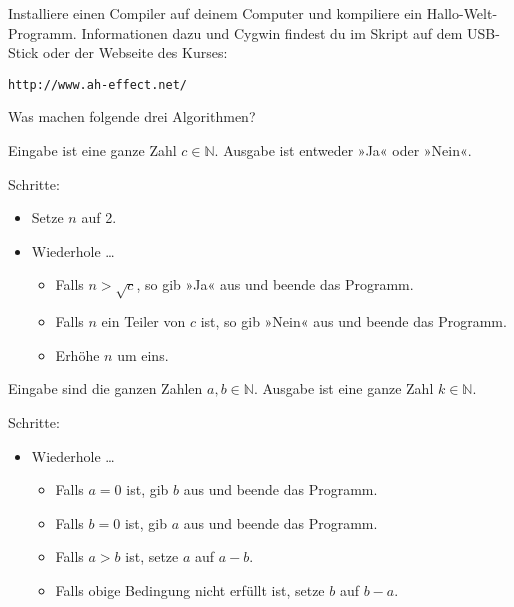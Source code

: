 \documentclass{uebungszettel}
\begin{document}
\begin{aufg}
Installiere einen Compiler auf deinem Computer und kompiliere ein Hallo-Welt-Programm. Informationen dazu und Cygwin findest du im Skript auf dem USB-Stick oder der Webseite des Kurses:
\begin{center}
	\verb|http://www.ah-effect.net/ |
\end{center}
\end{aufg}

\begin{aufg}
    Was machen folgende drei Algorithmen?

    \begin{algorithm}[H]
        \caption{}
        Eingabe ist eine ganze Zahl $c \in \mathbb N$. Ausgabe ist entweder »Ja« oder »Nein«.

        Schritte:
        \begin{itemize}
            \item
                Setze $n$ auf 2.
            \item
                Wiederhole …
                \begin{itemize}
                    \item
                        Falls $n > \sqrt c$, so gib »Ja« aus und beende das
                        Programm.
                    \item
                        Falls $n$ ein Teiler von $c$ ist, so gib »Nein« aus und
                        beende das Programm.
                    \item
                        Erhöhe $n$ um eins.
                \end{itemize}
        \end{itemize}
    \end{algorithm}

    \begin{algorithm}[H]
        \caption{}
        Eingabe sind die ganzen Zahlen $a, b \in \mathbb N$. Ausgabe ist eine
        ganze Zahl $k \in \mathbb N$.

        Schritte:
        \begin{itemize}
            \item Wiederhole …
                \begin{itemize}
                    \item
                        Falls $a = 0$ ist, gib $b$ aus und beende das Programm.
                    \item
                        Falls $b = 0$ ist, gib $a$ aus und beende das Programm.
                    \item
                        Falls $a > b$ ist, setze $a$ auf $a - b$.
                    \item
                        Falls obige Bedingung nicht erfüllt ist, setze $b$ auf
                        $b - a$.
                \end{itemize}
        \end{itemize}
    \end{algorithm}


\end{aufg}
\end{document}
